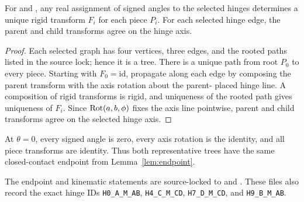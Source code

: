 \begin{lemma}
\label{lem:kinematics}
For \treeA{} and \treeB{}, any real assignment of signed angles to the selected
hinges determines a unique rigid transform \(F_i\) for each piece \(P_i\).  For
each selected hinge edge, the parent and child transforms agree on the hinge
axis.
\end{lemma}

\begin{proof}
Each selected graph has four vertices, three edges, and the rooted paths listed
in the source lock; hence it is a tree.  There is a unique path from root
\(P_0\) to every piece.  Starting with \(F_0=\mathrm{id}\), propagate along each
edge by composing the parent transform with the axis rotation about the parent-
placed hinge line.  A composition of rigid transforms is rigid, and uniqueness
of the rooted path gives uniqueness of \(F_i\).  Since \(\operatorname{Rot}(a,b,\phi)\) fixes
the axis line pointwise, parent and child transforms agree on the selected
hinge axis.
\end{proof}

At \(\theta=0\), every signed angle is zero, every axis rotation is the identity,
and all piece transforms are identity.  Thus both representative trees have the
same closed-contact endpoint from Lemma~\ref{lem:endpoint}.

\begin{certprop}
The endpoint and kinematic statements are source-locked to
 and
.  These files
also record the exact hinge IDs \texttt{H0\_A\_M\_AB}, \texttt{H4\_C\_M\_CD},
\texttt{H7\_D\_M\_CD}, and \texttt{H9\_B\_M\_AB}.
\end{certprop}
